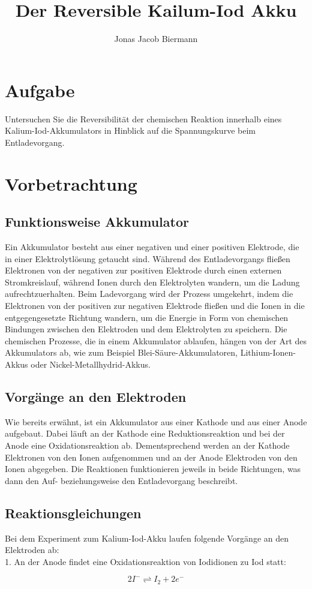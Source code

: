 \documentclass[11pt]{article}
\author{Jonas Jacob Biermann}
\title{Der Reversible Kailum-Iod Akku}
\begin{document}
\maketitle
\tableofcontents

\newpage

\section{Aufgabe}
Untersuchen Sie die Reversibilität der chemischen Reaktion innerhalb eines Kalium-Iod-Akkumulators in Hinblick auf die Spannungskurve beim Entladevorgang.

\section{Vorbetrachtung}

\subsection{Funktionsweise Akkumulator}
Ein Akkumulator besteht aus einer negativen und einer positiven Elektrode, die in einer Elektrolytlösung getaucht sind. Während des Entladevorgangs fließen Elektronen von der negativen zur positiven Elektrode durch einen externen Stromkreislauf, während Ionen durch den Elektrolyten wandern, um die Ladung aufrechtzuerhalten. Beim Ladevorgang wird der Prozess umgekehrt, indem die Elektronen von der positiven zur negativen Elektrode fließen und die Ionen in die entgegengesetzte Richtung wandern, um die Energie in Form von chemischen Bindungen zwischen den Elektroden und dem Elektrolyten zu speichern. Die chemischen Prozesse, die in einem Akkumulator ablaufen, hängen von der Art des Akkumulators ab, wie zum Beispiel Blei-Säure-Akkumulatoren, Lithium-Ionen-Akkus oder Nickel-Metallhydrid-Akkus.

\subsection{Vorgänge an den Elektroden}
Wie bereits erwähnt, ist ein Akkumulator aus einer Kathode und aus einer Anode aufgebaut. Dabei läuft an der Kathode eine Reduktionsreaktion und bei der Anode eine Oxidationsreaktion ab. Dementsprechend werden an der Kathode Elektronen von den Ionen aufgenommen und an der Anode Elektroden von den Ionen abgegeben. Die Reaktionen funktionieren jeweils in beide Richtungen, was dann den Auf- beziehungsweise den Entladevorgang beschreibt.

\subsection{Reaktionsgleichungen}
Bei dem Experiment zum Kalium-Iod-Akku laufen folgende Vorgänge an den Elektroden ab:\\
1. An der Anode findet eine Oxidationsreaktion von Iodidionen zu Iod statt:
\begin{center}
    \begin{equation}
        2 I^{-} \rightleftharpoons I_{2} + 2 e^{-}
    \end{equation}
\end{center}
\end{document}
